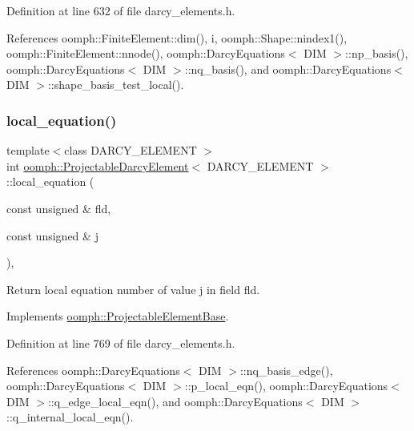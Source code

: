 Definition at line 632 of file darcy\+\_\+elements.\+h.



References oomph\+::\+Finite\+Element\+::dim(), i, oomph\+::\+Shape\+::nindex1(), oomph\+::\+Finite\+Element\+::nnode(), oomph\+::\+Darcy\+Equations$<$ D\+I\+M $>$\+::np\+\_\+basis(), oomph\+::\+Darcy\+Equations$<$ D\+I\+M $>$\+::nq\+\_\+basis(), and oomph\+::\+Darcy\+Equations$<$ D\+I\+M $>$\+::shape\+\_\+basis\+\_\+test\+\_\+local().

\mbox{\label{classoomph_1_1ProjectableDarcyElement_a7c003fb90c5a5892ce176b67f3cf18a0}} 
\subsubsection{\texorpdfstring{local\+\_\+equation()}{local\_equation()}}
{\footnotesize\ttfamily template$<$class D\+A\+R\+C\+Y\+\_\+\+E\+L\+E\+M\+E\+NT $>$ \\
int \hyperlink{classoomph_1_1ProjectableDarcyElement}{oomph\+::\+Projectable\+Darcy\+Element}$<$ D\+A\+R\+C\+Y\+\_\+\+E\+L\+E\+M\+E\+NT $>$\+::local\+\_\+equation (\begin{DoxyParamCaption}\item[{const unsigned \&}]{fld,  }\item[{const unsigned \&}]{j }\end{DoxyParamCaption})\hspace{0.3cm}{\ttfamily [inline]}, {\ttfamily [virtual]}}



Return local equation number of value j in field fld. 



Implements \hyperlink{classoomph_1_1ProjectableElementBase_ac5c27ae929ff636dc7747fe23fd4f738}{oomph\+::\+Projectable\+Element\+Base}.



Definition at line 769 of file darcy\+\_\+elements.\+h.



References oomph\+::\+Darcy\+Equations$<$ D\+I\+M $>$\+::nq\+\_\+basis\+\_\+edge(), oomph\+::\+Darcy\+Equations$<$ D\+I\+M $>$\+::p\+\_\+local\+\_\+eqn(), oomph\+::\+Darcy\+Equations$<$ D\+I\+M $>$\+::q\+\_\+edge\+\_\+local\+\_\+eqn(), and oomph\+::\+Darcy\+Equations$<$ D\+I\+M $>$\+::q\+\_\+internal\+\_\+local\+\_\+eqn().

